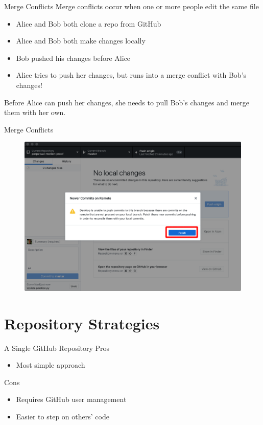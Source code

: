 \documentclass{beamer}
\begin{document}
    \begin{frame}{Merge Conflicts}
        Merge conflicts occur when one or more people edit the same file
        \begin{itemize}
            \item Alice and Bob both clone a repo from GitHub
            \item Alice and Bob both make changes locally
            \item Bob pushed his changes before Alice
            \item Alice tries to push her changes, but runs into a merge conflict with Bob's changes!
        \end{itemize}
        Before Alice can push her changes, she needs to pull Bob's changes and merge them with her own.
    \end{frame}

    \begin{frame}{Merge Conflicts}
        \begin{figure}
            \centering
            \includegraphics[width=\textwidth]{figures/merge_1.png}
        \end{figure}
    \end{frame}

    \section{Repository Strategies}\label{sec:repository-strategies}
    \begin{frame}{A Single GitHub Repository}
        Pros
        \begin{itemize}
            \item Most simple approach
        \end{itemize}

        Cons
        \begin{itemize}
            \item Requires GitHub user management
            \item Easier to step on others' code
        \end{itemize}
    \end{frame}
\end{document}
